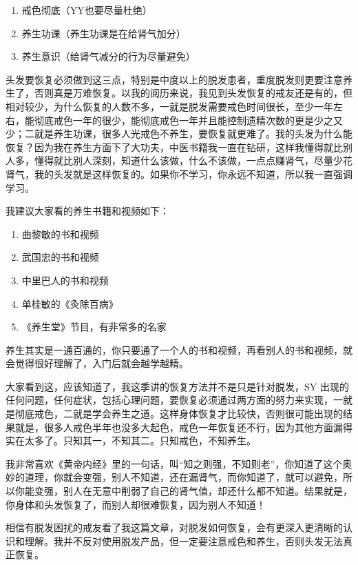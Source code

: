 \documentclass[fontset=founder]{ctexart}
\begin{document}
\begin{enumerate}
    \item 戒色彻底（YY也要尽量杜绝）
    \item 养生功课（养生功课是在给肾气加分）
    \item 养生意识（给肾气减分的行为尽量避免）
\end{enumerate}

头发要恢复必须做到这三点，特别是中度以上的脱发患者，重度脱发则更要注意养生了，否则真是万难恢复。以我的阅历来说，我见到头发恢复的戒友还是有的，但相对较少，为什么恢复的人数不多，一就是脱发需要戒色时间很长，至少一年左右，能彻底戒色一年的很少，能彻底戒色一年并且能控制遗精次数的更是少之又少；二就是养生功课，很多人光戒色不养生，要恢复就更难了。我的头发为什么能恢复？因为我在养生方面下了大功夫，中医书籍我一直在钻研，这样我懂得就比别人多，懂得就比别人深刻，知道什么该做，什么不该做，一点点赚肾气，尽量少花肾气，我的头发就是这样恢复的。如果你不学习，你永远不知道，所以我一直强调学习。

我建议大家看的养生书籍和视频如下：

\begin{enumerate}
    \item 曲黎敏的书和视频
    \item 武国忠的书和视频
    \item 中里巴人的书和视频
    \item 单桂敏的《灸除百病》
    \item 《养生堂》节目，有非常多的名家
\end{enumerate}

养生其实是一通百通的，你只要通了一个人的书和视频，再看别人的书和视频，就会觉得很好理解了，入门后就会越学越精。

大家看到这，应该知道了，我这季讲的恢复方法并不是只是针对脱发，SY 出现的任何问题，任何症状，包括心理问题，要恢复必须通过两方面的努力来实现，一就是彻底戒色，二就是学会养生之道。这样身体恢复才比较快，否则很可能出现的结果就是，很多人戒色半年也没多大起色，戒色一年恢复还不行，因为其他方面漏得实在太多了。只知其一，不知其二。只知戒色，不知养生。

我非常喜欢《黄帝内经》里的一句话，叫“知之则强，不知则老”，你知道了这个奥妙的道理，你就会变强，别人不知道，还在漏肾气，而你知道了，就可以避免，所以你能变强，别人在无意中削弱了自己的肾气值，却还什么都不知道。结果就是，你身体和头发恢复了，而别人却很难恢复，因为别人不知道！

相信有脱发困扰的戒友看了我这篇文章，对脱发如何恢复，会有更深入更清晰的认识和理解。我并不反对使用脱发产品，但一定要注意戒色和养生，否则头发无法真正恢复。
\end{document}
